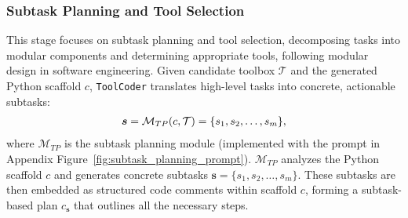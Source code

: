 \subsubsection{Subtask Planning and Tool Selection}
\label{sec:planning}
This stage focuses on subtask planning and tool selection, decomposing tasks into modular components and determining appropriate tools, following modular design in software engineering. Given candidate toolbox $\mathcal{T}$ and the generated Python scaffold $c$, \texttt{ToolCoder} translates high-level tasks into concrete, actionable subtasks:
\begin{equation}
\textstyle
\setlength\abovedisplayskip{0.2cm}
\setlength\belowdisplayskip{0.2cm}
\begin{aligned}
\boldsymbol{s} = \mathcal{M}_{TP}(c, \mathcal{T}) = \{s_1, s_2, \dots, s_m\},
\end{aligned}
\end{equation} 
where $\mathcal{M}_{TP}$ is the subtask planning module  (implemented with the prompt in Appendix Figure~\ref{fig:subtask_planning_prompt}). $\mathcal{M}_{TP}$ analyzes the Python scaffold $c$ and generates concrete subtasks $\boldsymbol{s} = \{s_1, s_2, \dots, s_m\}$. These subtasks are then embedded as structured code comments within scaffold $c$, forming a subtask-based plan $c_{\boldsymbol{s}}$ that outlines all the necessary steps.



